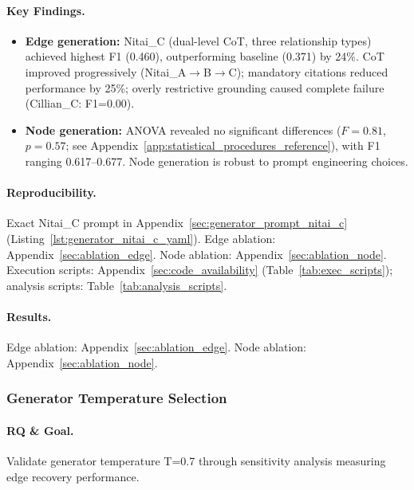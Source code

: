 \paragraph{Key Findings.}
\begin{itemize}[noitemsep]
    \item \textbf{Edge generation:} Nitai\_C (dual-level CoT, three relationship types) achieved highest F1 (0.460), outperforming baseline (0.371) by 24\%. CoT improved progressively (Nitai\_A$\rightarrow$B$\rightarrow$C); mandatory citations reduced performance by 25\%; overly restrictive grounding caused complete failure (Cillian\_C: F1=0.00).
    \item \textbf{Node generation:} ANOVA revealed no significant differences ($F=0.81$, $p=0.57$; see Appendix~\ref{app:statistical_procedures_reference}), with F1 ranging 0.617--0.677. Node generation is robust to prompt engineering choices.
\end{itemize}

\paragraph{Reproducibility.}
Exact Nitai\_C prompt in Appendix~\ref{sec:generator_prompt_nitai_c} (Listing~\ref{lst:generator_nitai_c_yaml}). Edge ablation: Appendix~\ref{sec:ablation_edge}. Node ablation: Appendix~\ref{sec:ablation_node}. Execution scripts: Appendix~\ref{sec:code_availability} (Table~\ref{tab:exec_scripts}); analysis scripts: Table~\ref{tab:analysis_scripts}.

\paragraph{Results.}
Edge ablation: Appendix~\ref{sec:ablation_edge}. Node ablation: Appendix~\ref{sec:ablation_node}.

\subsubsection{Generator Temperature Selection}
\label{sec:generator_temp_selection}

\paragraph{RQ \& Goal.}
Validate generator temperature T=0.7 through sensitivity analysis measuring edge recovery performance.

